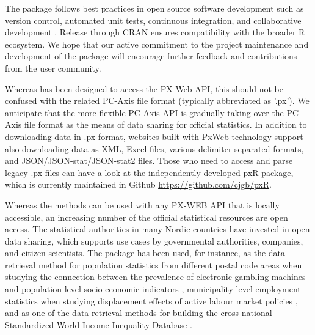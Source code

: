 
The package follows best practices in open source software development
such as version control, automated unit tests, continuous integration,
and collaborative development \citep{PerezRiverol2016}. Release
through CRAN ensures compatibility with the broader R ecosystem. We
hope that our active commitment to the project maintenance and
development of the package will encourage further feedback and
contributions from the user community.


Whereas  has been designed to access the PX-Web API, this should not be confused with the related PC-Axis file format (typically abbreviated as '.px'). We anticipate that the more flexible PC Axis API is gradually taking over the PC-Axis file format as the means of data sharing for official statistics. In addition to downloading data in .px format, websites built with PxWeb technology support also downloading data as XML, Excel-files, various delimiter separated formats, and JSON/JSON-stat/JSON-stat2 files. Those who need to access and parse legacy .px files can have a look at the independently developed pxR package, which is currently maintained in Github \url{https://github.com/cjgb/pxR}.


Whereas the methods can be used with any PX-WEB API that is locally accessible, an increasing number of the official statistical resources are open access. The statistical authorities in many Nordic countries have invested in open data sharing, which supports use cases by governmental authorities, companies, and citizen scientists. The package has been used, for instance, as the data retrieval method for population statistics from different postal code areas when studying the connection between the prevalence of electronic gambling machines and population level socio-economic indicators \citep{Raisamo2019}, municipality-level employment statistics when studying displacement effects of active labour market policies \citep{Hirvonen2021}, and as one of the data retrieval methods for building the cross-national Standardized World Income Inequality Database \citep{Solt2020}. %


